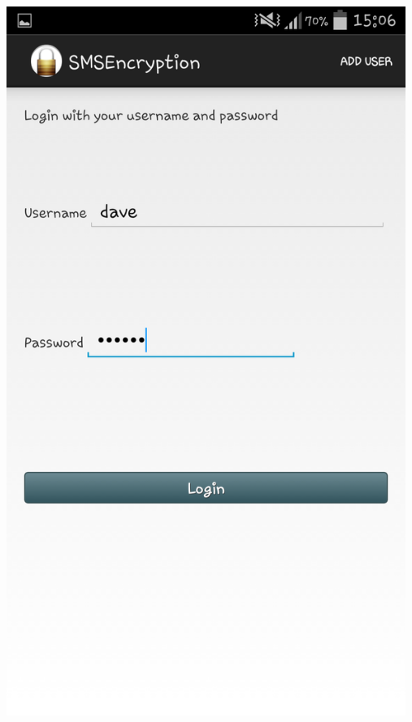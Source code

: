 \begin{center}
 \includegraphics[width=13cm]{screenshots/normal/2_LoginScreenFilledIn.png}
\end{center}
